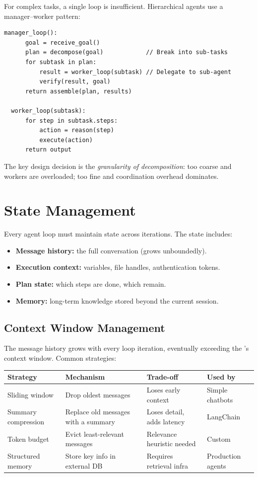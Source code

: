 For complex tasks, a single loop is insufficient. Hierarchical agents use a manager--worker pattern:

\begin{lstlisting}[caption=Hierarchical agent loops]
  manager_loop():
      goal = receive_goal()
      plan = decompose(goal)            // Break into sub-tasks
      for subtask in plan:
          result = worker_loop(subtask) // Delegate to sub-agent
          verify(result, goal)
      return assemble(plan, results)

  worker_loop(subtask):
      for step in subtask.steps:
          action = reason(step)
          execute(action)
      return output
\end{lstlisting}

The key design decision is the \emph{granularity of decomposition}: too coarse and workers are overloaded; too fine and coordination overhead dominates.

\section{State Management}

Every agent loop must maintain state across iterations. The state includes:

\begin{itemize}
	\item \textbf{Message history:} the full conversation (grows unboundedly).
	\item \textbf{Execution context:} variables, file handles, authentication tokens.
	\item \textbf{Plan state:} which steps are done, which remain.
	\item \textbf{Memory:} long-term knowledge stored beyond the current session.
\end{itemize}

\subsection{Context Window Management}

The message history grows with every loop iteration, eventually exceeding the \llm 's context window. Common strategies:

\begin{longtable}{p{3.5cm}p{4cm}p{4cm}p{3cm}}
	\toprule
	\textbf{Strategy}   & \textbf{Mechanism}                  & \textbf{Trade-off}         & \textbf{Used by}  \\
	\midrule
	Sliding window      & Drop oldest messages                & Loses early context        & Simple chatbots   \\
	Summary compression & Replace old messages with a summary & Loses detail, adds latency & LangChain         \\
	Token budget        & Evict least-relevant messages       & Relevance heuristic needed & Custom            \\
	Structured memory   & Store key info in external DB       & Requires retrieval infra   & Production agents \\
	\bottomrule
\end{longtable}

